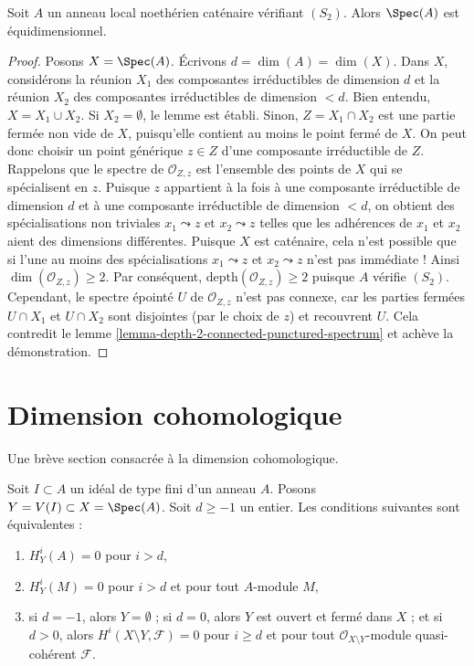 \begin{lemma}
\label{lemma-catenary-S2-equidimensional}
\begin{reference}
\cite[IV Corollary 5.10.9]{EGA}
\end{reference}
Soit $A$ un anneau local noethérien caténaire vérifiant $(S_2)$. Alors $\Spec(A)$ est équidimensionnel.
\end{lemma}

\begin{proof}
Posons $X = \Spec(A)$. Écrivons $d = \dim(A) = \dim(X)$. Dans $X$, considérons la réunion $X_1$ des composantes irréductibles de dimension $d$ et la réunion $X_2$ des composantes irréductibles de dimension $< d$. Bien entendu, $X = X_1 \cup X_2$. Si $X_2 = \emptyset$, le lemme est établi. Sinon, $Z = X_1 \cap X_2$ est une partie fermée non vide de $X$, puisqu'elle contient au moins le point fermé de $X$. On peut donc choisir un point générique $z \in Z$ d'une composante irréductible de $Z$. Rappelons que le spectre de $\mathcal{O}_{Z, z}$ est l'ensemble des points de $X$ qui se spécialisent en $z$. Puisque $z$ appartient à la fois à une composante irréductible de dimension $d$ et à une composante irréductible de dimension $< d$, on obtient des spécialisations non triviales $x_1 \leadsto z$ et $x_2 \leadsto z$ telles que les adhérences de $x_1$ et $x_2$ aient des dimensions différentes. Puisque $X$ est caténaire, cela n'est possible que si l'une au moins des spécialisations $x_1 \leadsto z$ et $x_2 \leadsto z$ n'est pas immédiate ! Ainsi $\dim(\mathcal{O}_{Z, z}) \geq 2$. Par conséquent, $\text{depth}(\mathcal{O}_{Z, z}) \geq 2$ puisque $A$ vérifie $(S_2)$. Cependant, le spectre épointé $U$ de $\mathcal{O}_{Z, z}$ n'est pas connexe, car les parties fermées $U \cap X_1$ et $U \cap X_2$ sont disjointes (par le choix de $z$) et recouvrent $U$. Cela contredit le lemme \ref{lemma-depth-2-connected-punctured-spectrum} et achève la démonstration.
\end{proof}



\section{Dimension cohomologique}
\label{section-cd}

\noindent
Une brève section consacrée à la dimension cohomologique.

\begin{lemma}
\label{lemma-cd}
Soit $I \subset A$ un idéal de type fini d'un anneau $A$. Posons $Y = V(I) \subset X = \Spec(A)$. Soit $d \geq -1$ un entier. Les conditions suivantes sont équivalentes :
\begin{enumerate}
\item $H^i_Y(A) = 0$ pour $i > d$,
\item $H^i_Y(M) = 0$ pour $i > d$ et pour tout $A$-module $M$,
\item si $d = -1$, alors $Y = \emptyset$ ; si $d = 0$, alors $Y$ est ouvert et fermé dans $X$ ; et si $d > 0$, alors $H^i(X \setminus Y, \mathcal{F}) = 0$ pour $i \geq d$ et pour tout $\mathcal{O}_{X \setminus Y}$-module quasi-cohérent $\mathcal{F}$.
\end{enumerate}
\end{lemma}

